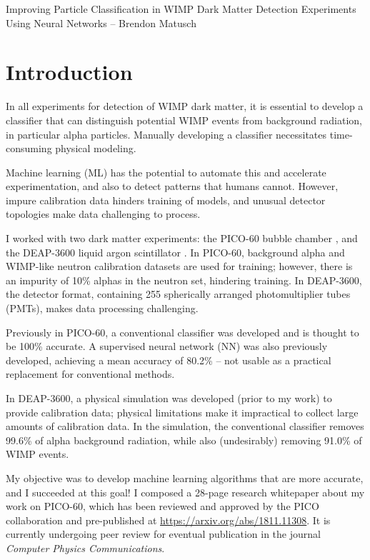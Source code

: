 \documentclass[12pt]{article}
\begin{document}
\begin{center}
    \begin{large}
        Improving Particle Classification in WIMP Dark Matter Detection Experiments Using Neural Networks -- Brendon Matusch
    \end{large}
\end{center}

\section{Introduction}

In all experiments for detection of WIMP dark matter, it is essential to develop a classifier that can distinguish potential WIMP events from background radiation, in particular alpha particles. Manually developing a classifier necessitates time-consuming physical modeling.

Machine learning (ML) has the potential to automate this and accelerate experimentation, and also to detect patterns that humans cannot. However, impure calibration data hinders training of models, and unusual detector topologies make data challenging to process.

I worked with two dark matter experiments: the PICO-60 bubble chamber \cite{pico}, and the DEAP-3600 liquid argon scintillator \cite{deap}. In PICO-60, background alpha and WIMP-like neutron calibration datasets are used for training; however, there is an impurity of 10\% alphas in the neutron set, hindering training. In DEAP-3600, the detector format, containing 255 spherically arranged photomultiplier tubes (PMTs), makes data processing challenging.

Previously in PICO-60, a conventional classifier was developed and is thought to be 100\% accurate. A supervised neural network (NN) was also previously developed, achieving a mean accuracy of 80.2\% -- not usable as a practical replacement for conventional methods.

In DEAP-3600, a physical simulation was developed (prior to my work) to provide calibration data; physical limitations make it impractical to collect large amounts of calibration data. In the simulation, the conventional classifier removes 99.6\% of alpha background radiation, while also (undesirably) removing 91.0\% of WIMP events.

My objective was to develop machine learning algorithms that are more accurate, and I succeeded at this goal! I composed a 28-page research whitepaper \cite{me} about my work on PICO-60, which has been reviewed and approved by the PICO collaboration and pre-published at \url{https://arxiv.org/abs/1811.11308}. It is currently undergoing peer review for eventual publication in the journal \textit{Computer Physics Communications}.
\end{document}
